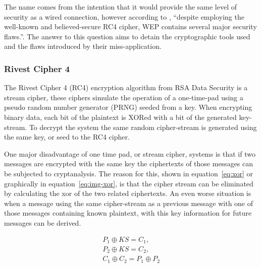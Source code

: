 \documentclass[pdftex, 11pt, a4paper]{article}
\begin{document}
The name comes from the intention that it would provide the same level of security as a wired connection, however according to \textcite{intercepting-wifi}, ``despite employing the well-known and believed-secure RC4 cipher, WEP contains several major security flaws.''.  The answer to this question aims to detain the cryptographic tools used and the flaws introduced by their miss-application.

\subsubsection{Rivest Cipher 4}
The Rivest Cipher 4 (RC4) encryption algorithm from RSA Data Security is a stream cipher, these ciphers simulate the operation of a one-time-pad using a pseudo random number generator (PRNG) seeded from a key\cite{otp-faq}. When encrypting binary data, each bit of the plaintext is XORed with a bit of the generated key-stream. To decrypt the system the same random cipher-stream is generated using the same key, or seed to the RC4 cipher.

One major disadvantage of one time pad, or stream cipher, systems is that if two messages are encrypted with the same key the ciphertexts of those messages can be subjected to cryptanalysis.  The reason for this, shown in equation~\ref{eq:xor} or graphically in equation~\ref{eq:img-xor}, is that the cipher stream can be eliminated by calculating the xor of the two related ciphertexts. An even worse situation is when a message using the same cipher-stream as a previous message with one of those messages containing known plaintext, with this key information for future messages can be derived.

\begin{subequations}
    \begin{align}
        P_1 \oplus KS = C_1,\\
        P_2 \oplus KS = C_2,\\
        C_1 \oplus C_2 = P_1 \oplus P_2\label{eq:xor}
    \end{align}
\end{subequations}
\end{document}
